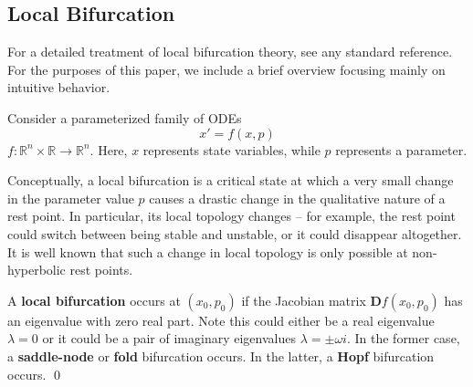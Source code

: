 \subsection{Local Bifurcation}

For a detailed treatment of local bifurcation theory, see any standard reference. For the purposes of this paper, we include a brief overview focusing mainly on intuitive behavior. 

Consider a parameterized family of ODEs
%
\begin{equation}
	x' = f(x, p)
\end{equation}
%
$f: \mathbb{R}^n \times \mathbb{R} \to \mathbb{R}^n$. Here, $x$ represents state variables, while $p$ represents a parameter. 

%

Conceptually, a local bifurcation is a critical state at which a very small change in the parameter value $p$ causes a drastic change in the qualitative nature of a rest point. In particular, its local topology changes -- for example, the rest point could switch between being stable and unstable, or it could disappear altogether. It is well known that such a change in local topology is only possible at non-hyperbolic rest points. 

\begin{definition}
	A \textbf{local bifurcation} occurs at ${\displaystyle (x_{0}, p_{0})}$ if the Jacobian matrix ${\displaystyle {\mathbf{D}f(x_{0},p _{0})}}$ has an eigenvalue with zero real part. Note this could either be a real eigenvalue $\lambda = 0$ or it could be a pair of imaginary eigenvalues $\lambda = \pm \omega i$. In the former case, a \textbf{saddle-node} or \textbf{fold} bifurcation occurs. In the latter, a \textbf{Hopf} bifurcation occurs. \qed
\end{definition}

